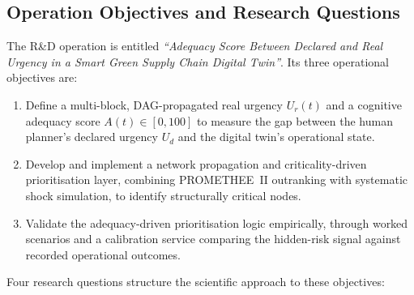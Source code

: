 \subsection{Operation Objectives and Research Questions}

The R\&D operation is entitled \textit{``Adequacy Score Between Declared and Real
Urgency in a Smart Green Supply Chain Digital Twin''}. Its three operational objectives are:

\begin{enumerate}[label=\textbf{O\arabic*.}]
    \item Define a multi-block, DAG-propagated real urgency $U_r(t)$ and a cognitive adequacy score $A(t) \in [0, 100]$ to measure the gap between the human planner's declared urgency $U_d$ and the digital twin's operational state.
    \item Develop and implement a network propagation and criticality-driven prioritisation layer, combining PROMETHEE~II outranking with systematic shock simulation, to identify structurally critical nodes.
    \item Validate the adequacy-driven prioritisation logic empirically, through worked scenarios and a calibration service comparing the hidden-risk signal against recorded operational outcomes.
\end{enumerate}

Four research questions structure the scientific approach to these objectives:


